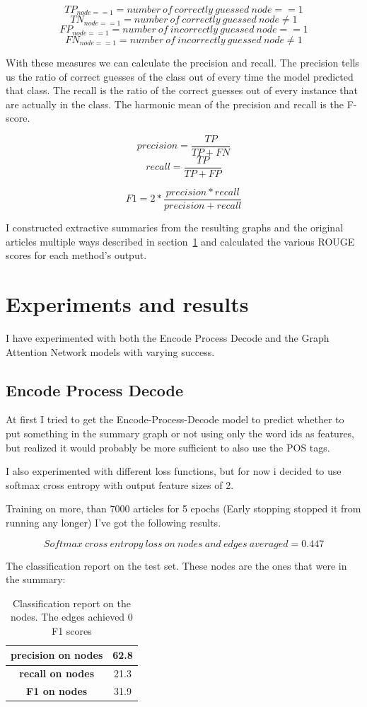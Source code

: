 \[TP_{node==1} = number\ of\ correctly\ guessed\ node==1\]
\[TN_{node==1} = number\ of\ correctly\ guessed\ node \neq 1\]
\[FP_{node==1} = number\ of\ incorrectly\ guessed\ node==1\]
\[FN_{node==1} = number\ of\ incorrectly\ guessed\ node \neq 1\]

With these measures we can calculate the precision and recall. The precision tells us the ratio of correct guesses of the class out of every time the model predicted that class. The recall is the ratio of the correct guesses out of every instance that are actually in the class. The harmonic mean of the precision and recall is the F-score.

\[precision = \frac{TP}{TP + FN}\]
\[recall = \frac{TP}{TP + FP}\]

\[F1 = 2 * \frac{precision * recall}{precision + recall}\]

I constructed extractive summaries from the resulting graphs and the original articles multiple ways described in section~\ref{ssect:ExperimnetsAndResults} and calculated the various ROUGE scores for each method's output.

\section{Experiments and results}\label{ssect:ExperimnetsAndResults}
I have experimented with both the Encode Process Decode and the Graph Attention Network models with varying success.
\subsection{Encode Process Decode}
At first I tried to get the Encode-Process-Decode model to predict whether to put something in the summary graph or not using only the word ids as features, but realized it would probably be more sufficient to also use the POS tags.

I also experimented with different loss functions, but for now i decided to use softmax cross entropy with output feature sizes of 2.

Training on more, than 7000 articles for 5 epochs (Early stopping stopped it from running any longer) I've got the following results.

\[Softmax\ cross\ entropy\ loss\ on\ nodes\ and\ edges\ averaged = 0.447\]

The classification report on the test set. These nodes are the ones that were in the summary:

\begin{table}[!ht]
	\centering
	\begin{tabular}{| c | c |}
		\hline
		\textbf{precision on nodes}&62.8 \\ \hline
		\textbf{recall on nodes}&21.3 \\ \hline
		\textbf{F1 on nodes}&31.9 \\ \hline
	\end{tabular}
	\caption{Classification report on the nodes. The edges achieved 0 F1 scores}
\end{table}

